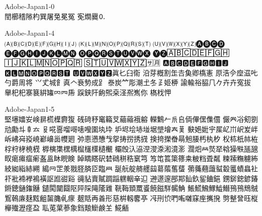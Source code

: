 %
%
%
%


Adobe-Japan1-0\\
𨳝櫛𥡴𨻶杓巽屠兔冕冤
𡨚𤏐爨🄀

Adobe-Japan1-4\\
🄐🄑🄒🄓🄔🄕🄖🄗🄘🄙
🄚🄛🄜🄝🄞🄟🄠🄡🄢🄣
🄤🄥🄦🄧🄨🄩🅐🅑🅒🅓
🅔🅕🅖🅗🅘🅙🅚🅛🅜🅝
🅞🅟🅠🅡🅢🅣🅤🅥🅦🅧
🅨🅩🄰🄱🄲🄳🄴🄵🄶🄷
🄸🄹🄺🄻🄼🄽🄾🄿🅀🅁
🅂🅃🅄🅅🅆🅇🅈🅉🈂🈷
🅰🅱🅲🅳🅴🅵🅶🅷🅸🅹
🅺🅻🅼🅽🅾🅿🆀🆁🆂🆃
🆄🆅🆆🆇🆈🆉眞𠤎𦥑𫟘
沿芽槪割𦈢𠮷𩵋卿𫞎憲
𠩤浩𫝆𫝷滋𠮟勺爵周将
𭕄𠀋城𩙿真𠆢𮕩𫝑成𧾷
𣳾炭𥫗彫潮𡈽冬𤴔姬𫞉
諭輸𥙿𦚰𠘨𠂊𠦄卉寃拔
𦦙𣏌杞𪧦𫞽絣𮉸𠔿𦉪𠂰
𮛪𨦇𨸗𫠚𤋮桒𣲾𠘑嶲你
𣘺𣏾𢘉

Adobe-Japan1-5\\
𡌛𡑮𡢽𡚴𡸴𣇄𣗄𣜿𣝣𤟱
𥒎𥔎𥝱𥧄𥶡𦫿𦹀𧃴𧚄𨉷
𨏍𪆐𠂉𠂢𠂤𠈓𠌫𠎁𠍱𠏹
𠑊𠔉𠗖𠝏𠠇𠠺𠢹𠥼𠦝𠫓
𠬝𠵅𠷡𠺕𠹭𠹤𠽟𡈁𡉕𡉻
𡉴𡋤𡋗𡋽𡌶𡍄𡏄𡑭𡗗𦰩
𡙇𡜆𡝂𡧃𡱖𡴭𡵅𡵸𡵢𡶡
𡶜𡶒𡶷𡷠𡸳𡼞𡽶𡿺𢅻𢌞
𢎭𢛳𢡛𢢫𢦏𢪸𢭏𢭐𢭆𢰝
𢮦𢰤𢷡𣇃𣇵𣆶𣍲𣏓𣏒𣏐
𣏤𣏕𣏚𣏟𣑊𣑑𣑋𣑥𣓤𣕚
𣖔𣘹𣙇𣘸𣜜𣜌𣝤𣟿𣟧𣠤
𣠽𣪘𣱿𣴀𣵀𣷺𣷹𣷓𣽾𤂖
𤄃𤇆𤇾𤎼𤘩𤚥𤢖𤩍𤭖𤭯
𤰖𤸎𤸷𤹪𤺋𥁊𥁕𥄢𥆩𥇥
𥇍𥈞𥉌𥐮𥓙𥖧𥞩𥞴𥧔𥫤
𥫣𥫱𥮲𥱋𥱤𥸮𥹖𥹥𥹢𥻘
𥻂𥻨𥼣𥽜𥿠𥿔𦀌𥿻𦀗𦁠
𦃭𦉰𦊆𣴎𦐂𦙾𦜝𦣝𦣪𦥯
𦧝𦨞𦩘𦪌𦪷𦱳𦳝𦹥𦾔𦿸
𦿶𦿷𧄍𧄹𧏛𧏚𧏾𧐐𧑉𧘕
𧘔𧘱𧚓𧜎𧜣𧝒𧦅𧪄𧮳𧮾
𧯇𧲸𧶠𧸐𨂊𨂻𨊂𨋳𨐌𨑕
𨕫𨗈𨗉𨛗𨛺𨥉𨥆𨥫𨦈𨦺
𨦻𨨞𨨩𨩱𨩃𨪙𨫍𨫤𨫝𨯁
𨯯𨴐𨵱𨷻𨸟𨸶𨺉𨻫𨼲𨿸
𩊠𩊱𩒐𩗏𩛰𩜙𩝐𩣆𩩲𩷛
𩸕𩺊𩹉𩻄𩻩𩻛𩿎𩿗𪀯𪀚
𪃹𪂂𢈘𪎌𪐷𪗱𪘂𪚲𠃵𤸄
𤿲𧵳再善形慈栟軔𪊲𠅘
𠖱𠛬𫝓𠵘𫝚𫝜𥧌𫝶𢹂𫝼
𠟈𢿫𧦴𫞂𫞋𣟱𫞔𤁋𫞬𫞯
𫟉𫟏𫟒𦲞𧰼𫟰𫝥𫠍𫠗𦍌
𩸽𪘚

